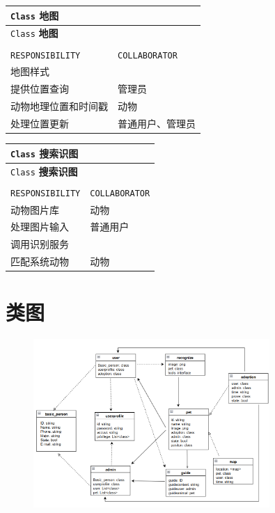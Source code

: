 \documentclass[12pt,a4paper,UTF8]{article}
\begin{document}
\vspace{0.8cm}

\begin{xltabular}{\linewidth}{|>{\raggedright\arraybackslash}p{8cm}|>{\raggedright\arraybackslash}p{4cm}|}
  \hline
  \verb|Class| \textbf{地图} &  \\ \hline \endfirsthead
  \hline
  \verb|Class| \textbf{地图} &  \\ \hline \endhead
  \hline
   \\ \endfoot
  \hline \endlastfoot

  \verb|RESPONSIBILITY| & \verb|COLLABORATOR| \\ \hline
  地图样式 &  \\ \hline
  提供位置查询 & 管理员 \\ \hline
  动物地理位置和时间戳 & 动物 \\ \hline
  处理位置更新 &  普通用户、管理员 \\ \hline
\end{xltabular}

\vspace{1cm}

\begin{xltabular}{\linewidth}{|>{\raggedright\arraybackslash}p{8cm}|>{\raggedright\arraybackslash}p{4cm}|}
  \hline
  \verb|Class| \textbf{搜索识图} &  \\ \hline \endfirsthead
  \hline
  \verb|Class| \textbf{搜索识图} &  \\ \hline \endhead
  \hline
   \\ \endfoot
  \hline \endlastfoot

  \verb|RESPONSIBILITY| & \verb|COLLABORATOR| \\ \hline
  动物图片库 & 动物 \\ \hline
  处理图片输入 & 普通用户 \\ \hline
  调用识别服务 &  \\ \hline
  匹配系统动物 & 动物 \\ \hline
\end{xltabular}

\section{类图}

\begin{figure}[H]
  \centering
  \includegraphics[width=0.8\textwidth]{figures/class.png}
\end{figure}
\end{document}
